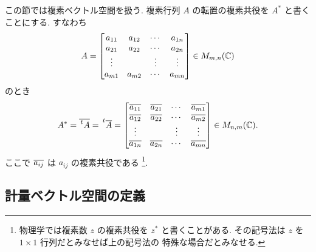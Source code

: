 \documentclass[12pt,twoside]{jarticle}
\begin{document}
この節では複素ベクトル空間を扱う.
複素行列 $A$ の転置の複素共役を $A^*$ と書くことにする. 
すなわち
\begin{equation*}
  A = 
  \begin{bmatrix}
    a_{11} & a_{12} & \cdots & a_{1n} \\
    a_{21} & a_{22} & \cdots & a_{2n} \\
    \vdots &        & \vdots & \vdots \\
    a_{m1} & a_{m2} & \cdots & a_{mn} \\
  \end{bmatrix}
  \in M_{m,n}({\mathbb C})
\end{equation*}
のとき
\begin{equation*}
  A^* = \cc{\tp{A}} = \tp{\cc{A}} =
  \begin{bmatrix}
    \cc{a_{11}} & \cc{a_{21}} & \cdots & \cc{a_{m1}} \\
    \cc{a_{12}} & \cc{a_{22}} & \cdots & \cc{a_{m2}} \\
    \vdots &        & \vdots & \vdots \\
    \cc{a_{1n}} & \cc{a_{2n}} & \cdots & \cc{a_{mn}} \\
  \end{bmatrix}
  \in M_{n,m}(\C).
\end{equation*}
ここで $\overline{a_{ij}}$ は $a_{ij}$ の複素共役である%
\footnote{物理学では複素数 $z$ の複素共役を $z^*$ と書くことがある.
  その記号法は $z$ を $1\times 1$ 行列だとみなせば上の記号法の
  特殊な場合だとみなせる.}.


\subsection{計量ベクトル空間の定義}
\end{document}
